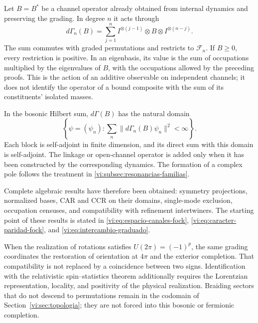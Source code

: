 Let \(B=B^*\) be a channel operator already obtained from internal
dynamics and preserving the grading. In degree \(n\) it acts through
\[
 d\Gamma_n(B)=\sum_{j=1}^n
 I^{\otimes(j-1)}\otimes B\otimes I^{\otimes(n-j)}.
\]
The sum commutes with graded permutations and restricts to
\(\mathcal F_n\). If \(B\ge0\), every restriction is positive.
In an eigenbasis, its value is the sum of occupations multiplied
by the eigenvalues of \(B\), with the occupations allowed by the
preceding proofs. This is the action of an additive observable on
independent channels; it does not identify the operator of a bound
composite with the sum of its constituents' isolated masses.

In the bosonic Hilbert sum, \(d\Gamma(B)\) has the natural domain
\[
 \left\{\psi=(\psi_n):
 \sum_n\|d\Gamma_n(B)\psi_n\|^2<\infty\right\}.
\]
Each block is self-adjoint in finite dimension, and its direct sum
with this domain is self-adjoint. The linkage or open-channel
operator is added only when it has been constructed by the corresponding
dynamics. The formation of a complex pole follows the treatment in
\ref{vi:subsec:resonancias-familias}.

Complete algebraic results have therefore been obtained:
symmetry projections, normalized bases, CAR and CCR on their domains,
single-mode exclusion, occupation censuses, and compatibility with
refinement intertwiners. The starting point of these results is
stated in \eqref{vi:eq:espacio-canales-fock},
\eqref{vi:eq:caracter-paridad-fock}, and
\eqref{vi:eq:intercambio-graduado}.

When the realization of rotations satisfies
\(U(2\pi)=(-1)^p\), the same grading coordinates the restoration
of orientation at \(4\pi\) and the exterior completion.
That compatibility is not replaced by a coincidence between two
signs. Identification with the relativistic spin--statistics theorem
additionally requires the Lorentzian representation, locality,
and positivity of the physical realization. Braiding sectors that
do not descend to permutations remain in the codomain of
Section~\ref{vi:sec:topologia}; they are not forced into this
bosonic or fermionic completion.
